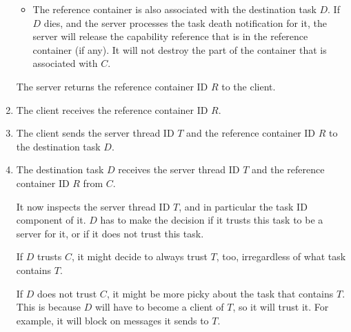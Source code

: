\begin{enumerate}
\begin{itemize}
  \item The reference container is also associated with the
    destination task $D$.  If $D$ dies, and the server processes the
    task death notification for it, the server will release the
    capability reference that is in the reference container (if any).
    It will not destroy the part of the container that is associated
    with $C$.
  \end{itemize}

  The server returns the reference container ID $R$ to the client.

\item The client receives the reference container ID $R$.

  \begin{comment}
    If several capabilities have to be copied in one message, the
    above steps need to be repeated for each capability.  With
    appropriate interfaces, capabilities could be collected so that
    only one call per server has to be made.  We are assuming here
    that only one capability is copied.
  \end{comment}

\item The client sends the server thread ID $T$ and the reference
  container ID $R$ to the destination task $D$.
  
\item The destination task $D$ receives the server thread ID $T$ and
  the reference container ID $R$ from $C$.
  
  It now inspects the server thread ID $T$, and in particular the task
  ID component of it.  $D$ has to make the decision if it trusts this
  task to be a server for it, or if it does not trust this task.
  
  If $D$ trusts $C$, it might decide to always trust $T$, too,
  irregardless of what task contains $T$.
  
  If $D$ does not trust $C$, it might be more picky about the task
  that contains $T$.  This is because $D$ will have to become a client
  of $T$, so it will trust it.  For example, it will block on messages
  it sends to $T$.

  \begin{comment}
    If $D$ is a server, it will usually only accept capabilities from
    its client that are provided by specific other servers it trusts.
    This can be the authentication server, for example (see section
    \ref{auth} on page \pageref{auth}).
    
    Usually, the type of capability that $D$ wants to accept from $C$
    is then further restricted, and only one possible trusted server
    implements that type of capabilities.  Thus, $D$ can simply
    compare the task ID of $T$ with the task ID of its trusted server
    (authentication server, ...) to make the decision if it wants to
    accept the capability or not.
  \end{comment}
  

\end{enumerate}
